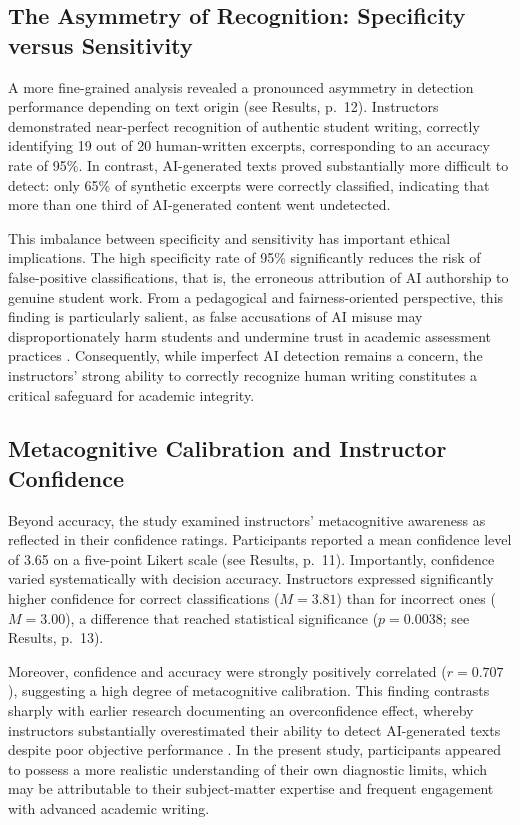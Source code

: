 \documentclass[12pt]{article}
\begin{document}
\subsection{The Asymmetry of Recognition: Specificity versus Sensitivity}

A more fine-grained analysis revealed a pronounced asymmetry in detection performance depending on text origin (see Results, p.~12). Instructors demonstrated near-perfect recognition of authentic student writing, correctly identifying 19 out of 20 human-written excerpts, corresponding to an accuracy rate of 95\%. In contrast, AI-generated texts proved substantially more difficult to detect: only 65\% of synthetic excerpts were correctly classified, indicating that more than one third of AI-generated content went undetected.

This imbalance between specificity and sensitivity has important ethical implications. The high specificity rate of 95\% significantly reduces the risk of false-positive classifications, that is, the erroneous attribution of AI authorship to genuine student work. From a pedagogical and fairness-oriented perspective, this finding is particularly salient, as false accusations of AI misuse may disproportionately harm students and undermine trust in academic assessment practices \autocite[11]{deriba_fairness_2025}. Consequently, while imperfect AI detection remains a concern, the instructors’ strong ability to correctly recognize human writing constitutes a critical safeguard for academic integrity.

\newpage
\subsection{Metacognitive Calibration and Instructor Confidence}

Beyond accuracy, the study examined instructors’ metacognitive awareness as reflected in their confidence ratings. Participants reported a mean confidence level of 3.65 on a five-point Likert scale (see Results, p.~11). Importantly, confidence varied systematically with decision accuracy. Instructors expressed significantly higher confidence for correct classifications ($M = 3.81$) than for incorrect ones ($M = 3.00$), a difference that reached statistical significance ($p = 0.0038$; see Results, p.~13).

Moreover, confidence and accuracy were strongly positively correlated ($r = 0.707$), suggesting a high degree of metacognitive calibration. This finding contrasts sharply with earlier research documenting an overconfidence effect, whereby instructors substantially overestimated their ability to detect AI-generated texts despite poor objective performance \autocite[8]{fleckenstein_teachers_2024}. In the present study, participants appeared to possess a more realistic understanding of their own diagnostic limits, which may be attributable to their subject-matter expertise and frequent engagement with advanced academic writing.
\end{document}
